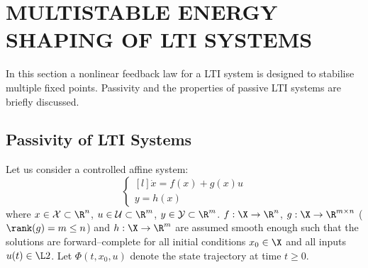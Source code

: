 \section{MULTISTABLE ENERGY SHAPING OF LTI SYSTEMS}\label{sec:multistable}
%
%
In this section a nonlinear feedback law for a LTI system is designed to stabilise multiple fixed points. Passivity and the properties of passive LTI systems are briefly discussed.
\subsection{Passivity of LTI Systems}
%
%
%
Let us consider a controlled affine system:
\begin{equation}\label{eq:nlaffine}
    \left\{
    \begin{matrix*}[l]
        \dot{x} = f(x) + g(x)u\\
        y = h(x)
    \end{matrix*}
    \right.
\end{equation}
where $x\in\mathcal{X}\subset\R^n$, $u\in\mathcal{U}\subset\R^m$, $y\in\mathcal{Y}\subset\R^m$. $f:\X\rightarrow\R^n$, $g:\X\rightarrow\R^{m\times n}$ ($\rank(g)= m\leq n$) and $h:\X\rightarrow\R^m$ are assumed smooth enough such that the solutions are forward--complete for all initial conditions $x_0\in\X$ and all inputs $u(t)\in\L2$. Let $\Phi(t,x_0,u)$ denote the state trajectory at time $t\geq0$.

